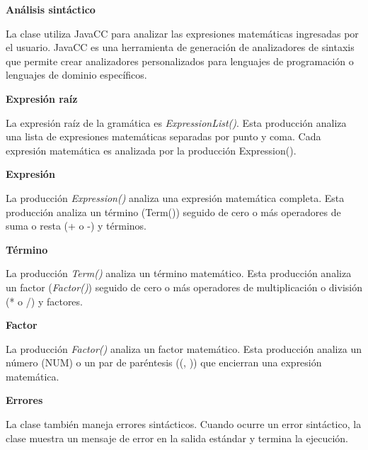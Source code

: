 \phantom{text}

\noindent \textbf{Análisis sintáctico}

\phantom{text}

\noindent La clase utiliza JavaCC para analizar las expresiones matemáticas ingresadas por el usuario. JavaCC es una herramienta de generación de analizadores de sintaxis que permite crear analizadores personalizados para lenguajes de programación o lenguajes de dominio específicos.

\phantom{text}

\noindent \textbf{Expresión raíz}

\phantom{text}

\noindent La expresión raíz de la gramática es \textit{ExpressionList()}. Esta producción analiza una lista de expresiones matemáticas separadas por punto y coma. Cada expresión matemática es analizada por la producción Expression().

\phantom{text}

\noindent \textbf{Expresión}

\phantom{text}

\noindent La producción \textit{Expression()} analiza una expresión matemática completa. Esta producción analiza un término (Term()) seguido de cero o más operadores de suma o resta (+ o -) y términos.

\phantom{text}

\noindent \textbf{Término}

\phantom{text}

\noindent La producción \textit{Term()} analiza un término matemático. Esta producción analiza un factor (\textit{Factor()}) seguido de cero o más operadores de multiplicación o división (* o /) y factores.

\phantom{text}

\noindent \textbf{Factor}

\phantom{text}

\noindent La producción \textit{Factor()} analiza un factor matemático. Esta producción analiza un número (NUM) o un par de paréntesis ((, )) que encierran una expresión matemática.

\phantom{text}

\noindent \textbf{Errores}

\phantom{text}

\noindent La clase también maneja errores sintácticos. Cuando ocurre un error sintáctico, la clase muestra un mensaje de error en la salida estándar y termina la ejecución.

